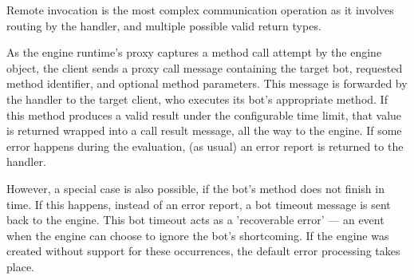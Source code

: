 		Remote invocation is the most complex communication operation as it involves routing by the handler, and multiple possible valid return types.
		
		As the engine runtime's proxy captures a method call attempt by the engine object, the client sends a proxy call message containing the target bot, requested method identifier, and optional method parameters. This message is forwarded by the handler to the target client, who executes its bot's appropriate method. If this method produces a valid result under the configurable time limit, that value is returned wrapped into a call result message, all the way to the engine. If some error happens during the evaluation, (as usual) an error report is returned to the handler.
		
		However, a special case is also possible, if the bot's method does not finish in time. If this happens, instead of an error report, a bot timeout message is sent back to the engine. This bot timeout acts as a 'recoverable error' --- an event when the engine can choose to ignore the bot's shortcoming. If the engine was created without support for these occurrences, the default error processing takes place.
		
